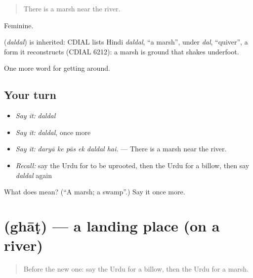 \begin{quote}
There is a marsh near the river.
\end{quote}

Feminine.

\begin{cousinweb}
\textbf{} (\emph{daldal}) is inherited: CDIAL lists Hindi \emph{daldal}, \textquotedblleft{}a marsh\textquotedblright{}, under \emph{dal}, \textquotedblleft{}quiver\textquotedblright{}, a form it reconstructs (CDIAL 6212): a marsh is ground that shakes underfoot.
\end{cousinweb}

\begin{grammarlens}[title={What you've built}]
One more word for getting around.
\end{grammarlens}

\subsection*{Your turn}
\begin{itemize}
\raggedright
  \item \emph{Say it:} \emph{daldal}
  \item \emph{Say it:} \emph{daldal}, once more
  \item \emph{Say it:} \emph{daryā ke pās ek daldal hai.} — There is a marsh near the river.
  \item \emph{Recall:} say the Urdu for to be uprooted, then the Urdu for a billow, then say \emph{daldal} again
\end{itemize}

\begin{tcolorbox}[breakable,colback=teal!4,colframe=teal!35!black,title={Before you move on}]
What does  mean? (\textquotedblleft{}A marsh; a swamp\textquotedblright{}.) Say it once more.
\end{tcolorbox}
\section[\texorpdfstring{\ur{گھاٹ} (ghāṭ)}{گھاٹ (ghāṭ)}]{ (ghāṭ) — a landing place (on a river)}

\label{lesson:UR-C434-ghat}



\begin{quote}
Before the new one: say the Urdu for a billow, then the Urdu for a marsh.
\end{quote}

